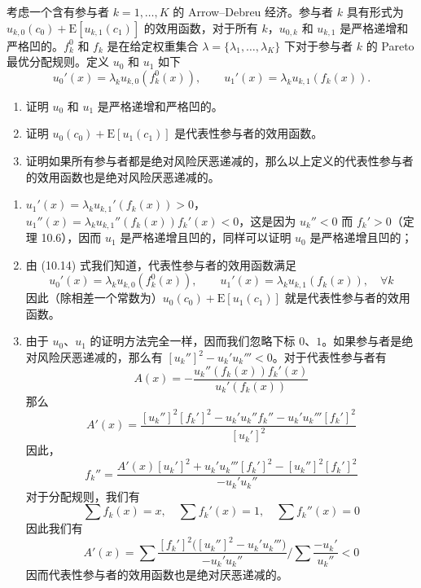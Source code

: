 \begin{problem}
 考虑一个含有参与者 $k=1,\dots,K$ 的 Arrow--Debreu 经济。参与者 $k$ 具有形式为 $u_{k,0}(c_{0})+\mathrm{E}[u_{k,1}(c_{1})]$ 的效用函数，对于所有 $k$，$u_{0,k}$ 和 $u_{k,1}$ 是严格递增和严格凹的。$f_{k}^{0}$ 和 $f_{k}$ 是在给定权重集合 $\lambda=\{\lambda_{1},\dots,\lambda_{K}\}$ 下对于参与者 $k$ 的 Pareto 最优分配规则。定义 $u_{0}$ 和 $u_{1}$ 如下
\[
    u_{0}'(x)=\lambda_{k}u_{k,0}(f_{k}^{0}(x)),\qquad u_{1}'(x)=\lambda_{k}u_{k,1}(f_{k}(x)).
\]
\begin{enumerate}[label=(\alph*)]
    \item 证明 $u_{0}$ 和 $u_{1}$ 是严格递增和严格凹的。
    \item 证明 $u_{0}(c_{0})+\mathrm{E}[u_{1}(c_{1})]$ 是代表性参与者的效用函数。
    \item 证明如果所有参与者都是绝对风险厌恶递减的，那么以上定义的代表性参与者的效用函数也是绝对风险厌恶递减的。
\end{enumerate}
\end{problem}
\begin{solution}
\begin{enumerate}[label=(\alph*)]
    \item $u_{1}'(x)=\lambda_{k}u_{k,1}'(f_{k}(x))>0$，$u_{1}''(x)=\lambda_{k}u_{k,1}''(f_{k}(x))f_{k}'(x)<0$，这是因为 $u_{k}''<0$ 而 $f_{k}'>0$（定理 10.6），因而 $u_{1}$ 是严格递增且凹的，同样可以证明 $u_{0}$ 是严格递增且凹的；
    \item 由 (10.14) 式我们知道，代表性参与者的效用函数满足
    \[
        u_{0}'(x)=\lambda_{k}u_{k,0}(f_{k}^{0}(x)),\qquad u_{1}'(x)=\lambda_{k}u_{k,1}(f_{k}(x)),\quad\forall k
    \]
    因此（除相差一个常数为）$u_{0}(c_{0})+\mathrm{E}[u_{1}(c_{1})]$ 就是代表性参与者的效用函数。
    \item 由于 $u_{0}$、$u_{1}$ 的证明方法完全一样，因而我们忽略下标 $0$、$1$。如果参与者是绝对风险厌恶递减的，那么有 $[u_{k}'']^{2}-u_{k}'u_{k}'''<0$。对于代表性参与者有
    \[
        A(x)=-\frac{u_{k}''(f_{k}(x))f_{k}'(x)}{u_{k}'(f_{k}(x))}
    \]
    那么
    \[
        A'(x)=\frac{[u_{k}'']^{2}[f_{k}']^{2}-u_{k}'u_{k}''f_{k}''-u_{k}'u_{k}'''[f_{k}']^{2}}{[u_{k}']^{2}}
    \]
    因此，
    \[
        f_{k}''=\frac{A'(x)[u_{k}']^{2}+u_{k}'u_{k}'''[f_{k}']^{2}-[u_{k}'']^{2}[f_{k}']^{2}}{-u_{k}'u_{k}''}
    \]
    对于分配规则，我们有
    \[
        \sum f_{k}(x)=x,\quad \sum f_{k}'(x)=1,\quad \sum f_{k}''(x)=0
    \]
    因此我们有
    \[
        A'(x)=\sum\frac{[f_{k}']^{2}\bigl([u_{k}'']^{2}-u_{k}'u_{k}'''\bigr)}{-u_{k}'u_{k}''}\Big/\sum\frac{-u_{k}'}{u_{k}''}<0
    \]
    因而代表性参与者的效用函数也是绝对厌恶递减的。
\end{enumerate}
\end{solution}

